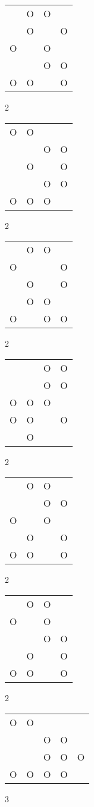 \begin{tabular}{|m{0.2cm}m{0.2cm}m{0.2cm}m{0.2cm}|}\hline
 &O&O& \\
 &O& &O\\
O& &O& \\
 & &O&O\\
O&O& &O\\
\hline\end{tabular}2
\begin{tabular}{|m{0.2cm}m{0.2cm}m{0.2cm}m{0.2cm}|}\hline
O&O& & \\
 & &O&O\\
 &O& &O\\
 & &O&O\\
O&O&O& \\
\hline\end{tabular}2
\begin{tabular}{|m{0.2cm}m{0.2cm}m{0.2cm}m{0.2cm}|}\hline
 &O&O& \\
O& & &O\\
 &O& &O\\
 &O&O& \\
O& &O&O\\
\hline\end{tabular}2
\begin{tabular}{|m{0.2cm}m{0.2cm}m{0.2cm}m{0.2cm}|}\hline
 & &O&O\\
 & &O&O\\
O&O&O& \\
O&O& &O\\
 &O& & \\
\hline\end{tabular}2
\begin{tabular}{|m{0.2cm}m{0.2cm}m{0.2cm}m{0.2cm}|}\hline
 &O&O& \\
 & &O&O\\
O& &O& \\
 &O& &O\\
O&O& &O\\
\hline\end{tabular}2
\begin{tabular}{|m{0.2cm}m{0.2cm}m{0.2cm}m{0.2cm}|}\hline
 &O&O& \\
O& &O& \\
 & &O&O\\
 &O& &O\\
O&O& &O\\
\hline\end{tabular}2
\begin{tabular}{|m{0.2cm}m{0.2cm}m{0.2cm}m{0.2cm}m{0.2cm}|}\hline
O&O& & & \\
 & &O&O& \\
 & &O&O&O\\
O&O&O&O& \\
\hline\end{tabular}3
